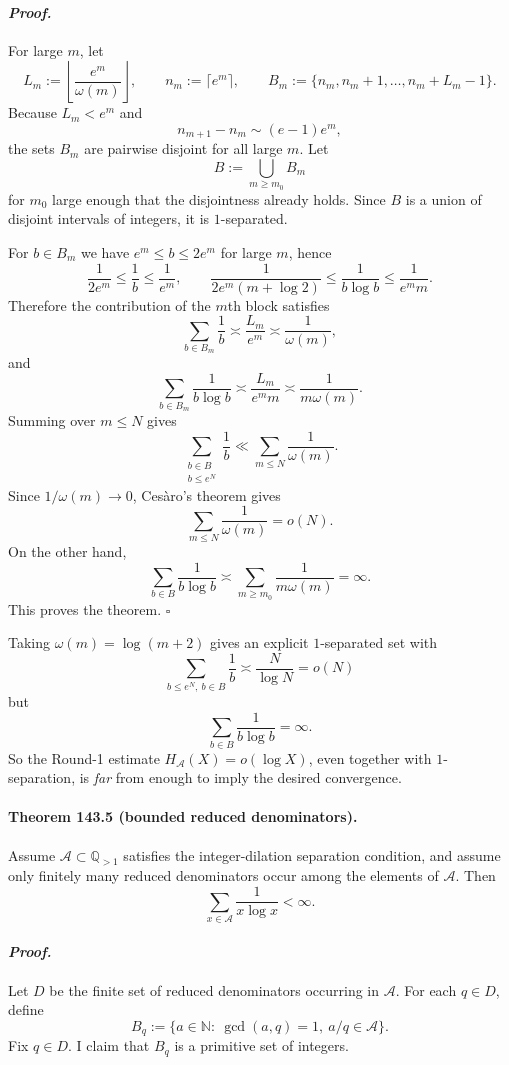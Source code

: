 \paragraph{\textit{Proof.}}
For large $m$, let
\[
L_m:=\left\lfloor \frac{e^m}{\omega(m)}\right\rfloor,
\qquad
n_m:=\lceil e^m\rceil,
\qquad
B_m:=\{n_m,n_m+1,\dots,n_m+L_m-1\}.
\]
Because $L_m<e^m$ and
\[
n_{m+1}-n_m \sim (e-1)e^m,
\]
the sets $B_m$ are pairwise disjoint for all large $m$. Let
\[
B:=\bigcup_{m\ge m_0} B_m
\]
for $m_0$ large enough that the disjointness already holds. Since $B$ is a union of disjoint intervals of integers, it is $1$-separated.

For $b\in B_m$ we have $e^m\le b\le 2e^m$ for large $m$, hence
\[
\frac{1}{2e^m}\le \frac1b\le \frac{1}{e^m},
\qquad
\frac{1}{2e^m(m+\log 2)}\le \frac{1}{b\log b}\le \frac{1}{e^m m}.
\]
Therefore the contribution of the $m$th block satisfies
\[
\sum_{b\in B_m}\frac1b \asymp \frac{L_m}{e^m}\asymp \frac{1}{\omega(m)},
\]
and
\[
\sum_{b\in B_m}\frac{1}{b\log b}\asymp \frac{L_m}{e^m m}\asymp \frac{1}{m\omega(m)}.
\]
Summing over $m\le N$ gives
\[
\sum_{\substack{b\in B\\ b\le e^N}}\frac1b
\ll
\sum_{m\le N}\frac{1}{\omega(m)}.
\]
Since $1/\omega(m)\to 0$, Ces\`aro's theorem gives
\[
\sum_{m\le N}\frac{1}{\omega(m)}=o(N).
\]
On the other hand,
\[
\sum_{b\in B}\frac{1}{b\log b}
\asymp
\sum_{m\ge m_0}\frac{1}{m\omega(m)}
=
\infty.
\]
This proves the theorem. \hfill $\square$

\medskip

Taking $\omega(m)=\log(m+2)$ gives an explicit $1$-separated set with
\[
\sum_{b\le e^N,\ b\in B}\frac1b \asymp \frac{N}{\log N}=o(N)
\]
but
\[
\sum_{b\in B}\frac{1}{b\log b}=\infty.
\]
So the Round-1 estimate $H_{\mathcal A}(X)=o(\log X)$, even together with $1$-separation, is
\emph{far} from enough to imply the desired convergence.

\paragraph{\textbf{Theorem 143.5 (bounded reduced denominators).}}
Assume $\mathcal A\subset \mathbb Q_{>1}$ satisfies the integer-dilation separation condition, and
assume only finitely many reduced denominators occur among the elements of $\mathcal A$.
Then
\[
\sum_{x\in\mathcal A}\frac{1}{x\log x}<\infty.
\]

\paragraph{\textit{Proof.}}
Let $D$ be the finite set of reduced denominators occurring in $\mathcal A$.
For each $q\in D$, define
\[
B_q:=\{a\in\mathbb N:\ \gcd(a,q)=1,\ a/q\in \mathcal A\}.
\]
Fix $q\in D$. I claim that $B_q$ is a primitive set of integers.

